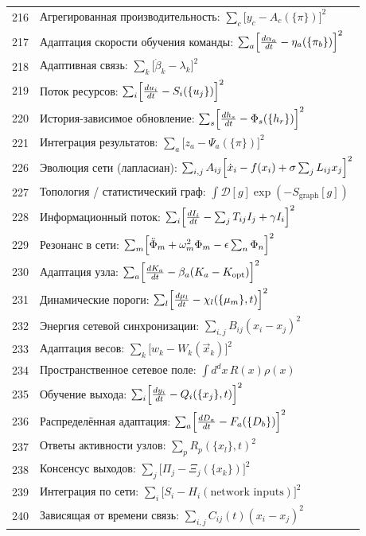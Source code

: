 \documentclass[12pt,a4paper]{article}
\begin{document}
\begin{longtable}{r l}
		216 & Агрегированная производительность: $\sum_c\bigl[y_c - A_c(\{\pi\})\bigr]^2$ \\
		217 & Адаптация скорости обучения команды: $\sum_a\Bigl[\frac{d\alpha_a}{dt} - \eta_a(\{\pi_b\})\Bigr]^2$ \\
		218 & Адаптивная связь: $\sum_k\bigl[\dot\beta_k - \lambda_k\bigr]^2$ \\
		219 & Поток ресурсов: $\sum_i\Bigl[\frac{du_i}{dt} - S_i(\{u_j\})\Bigr]^2$ \\
		220 & История-зависимое обновление: $\sum_s\Bigl[\frac{dh_s}{dt} - \Phi_s(\{h_r\})\Bigr]^2$ \\
		221 & Интеграция результатов: $\sum_a\bigl[z_a - \Psi_a(\{\pi\})\bigr]^2$ \\
		226 & Эволюция сети (лапласиан): $\sum_{i,j}A_{ij}\Bigl[\dot x_i - f(x_i) + \sigma\sum_j L_{ij}x_j\Bigr]^2$ \\
		227 & Топология / статистический граф: $\int\mathcal{D}[g]\exp(-S_{\text{graph}}[g])$ \\
		228 & Информационный поток: $\sum_i\Bigl[\frac{dI_i}{dt} - \sum_j T_{ij}I_j + \gamma I_i\Bigr]^2$ \\
		229 & Резонанс в сети: $\sum_m\Bigl[\ddot\Phi_m + \omega_m^2\Phi_m - \epsilon\sum_n\Phi_n\Bigr]^2$ \\
		230 & Адаптация узла: $\sum_a\Bigl[\frac{dK_a}{dt} - \beta_a(K_a - K_{\text{opt}})\Bigr]^2$ \\
		231 & Динамические пороги: $\sum_l\Bigl[\frac{d\mu_l}{dt} - \chi_l(\{\mu_m\},t)\Bigr]^2$ \\
		232 & Энергия сетевой синхронизации: $\sum_{i,j}B_{ij}(x_i - x_j)^2$ \\
		233 & Адаптация весов: $\sum_k\bigl[w_k - W_k(\vec x_k)\bigr]^2$ \\
		234 & Пространственное сетевое поле: $\int d^dx\,R(x)\rho(x)$ \\
		235 & Обучение выхода: $\sum_i\Bigl[\frac{dy_i}{dt} - Q_i(\{x_j\},t)\Bigr]^2$ \\
		236 & Распределённая адаптация: $\sum_a\Bigl[\frac{dD_a}{dt} - F_a(\{D_b\})\Bigr]^2$ \\
		237 & Ответы активности узлов: $\sum_p R_p(\{x_l\},t)^2$ \\
		238 & Консенсус выходов: $\sum_j\bigl[\Pi_j - \Xi_j(\{x_k\})\bigr]^2$ \\
		239 & Интеграция по сети: $\sum_i\bigl[S_i - H_i(\text{network inputs})\bigr]^2$ \\
		240 & Зависящая от времени связь: $\sum_{i,j}C_{ij}(t)(x_i - x_j)^2$ \\

\end{longtable}
\end{document}
